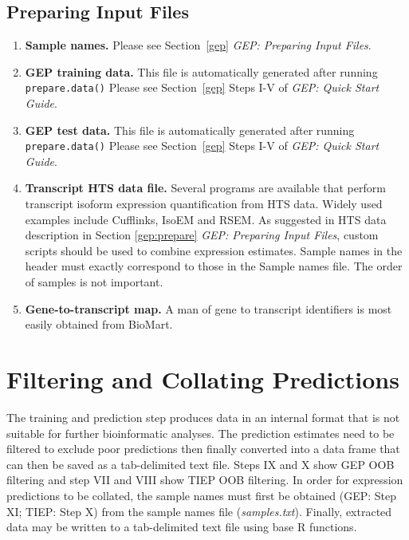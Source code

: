 \documentclass[a4paper,12pt]{article}
\begin{document}
\subsection{Preparing Input Files}
\label{tiep:prepare}
\begin{enumerate}
\item \textbf{Sample names.} Please see Section~\ref{gep} \textit{GEP: Preparing Input Files}.

\item \textbf{GEP training data.} This file is automatically generated after running \texttt{prepare.data()} Please see Section~\ref{gep} Steps I-V of \textit{GEP: Quick Start Guide}.

\item \textbf{GEP test data.} This file is automatically generated after running \texttt{prepare.data()} Please see Section~\ref{gep} Steps I-V of \textit{GEP: Quick Start Guide}.

\item \textbf{Transcript HTS data file.} Several programs are available that perform transcript isoform expression quantification from HTS data. Widely used examples include \textsf{Cufflinks}, \textsf{IsoEM} and \textsf{RSEM}. As suggested in HTS data description in Section \ref{gep:prepare} \textit{GEP: Preparing Input Files}, custom scripts should be used to combine expression estimates. Sample names in the header must exactly correspond to those in the Sample names file. The order of samples is not important.

\item \textbf{Gene-to-transcript map.} A man of gene to transcript identifiers is most easily obtained from \textsf{BioMart}.
\end{enumerate}

\section{Filtering and Collating Predictions}
\label{filtering}

The training and prediction step produces data in an internal format that is not suitable for further bioinformatic analyses. The prediction estimates need to be filtered to exclude poor predictions then finally converted into a data frame that can then be saved as a tab-delimited text file. Steps IX and X show GEP OOB filtering and step VII and VIII show TIEP OOB filtering. In order for expression predictions to be collated, the sample names must first be obtained (GEP: Step XI; TIEP: Step X) from the sample names file (\textit{samples.txt}). Finally, extracted data may be written to a tab-delimited text file using base \textsf{R} functions.
\end{document}
